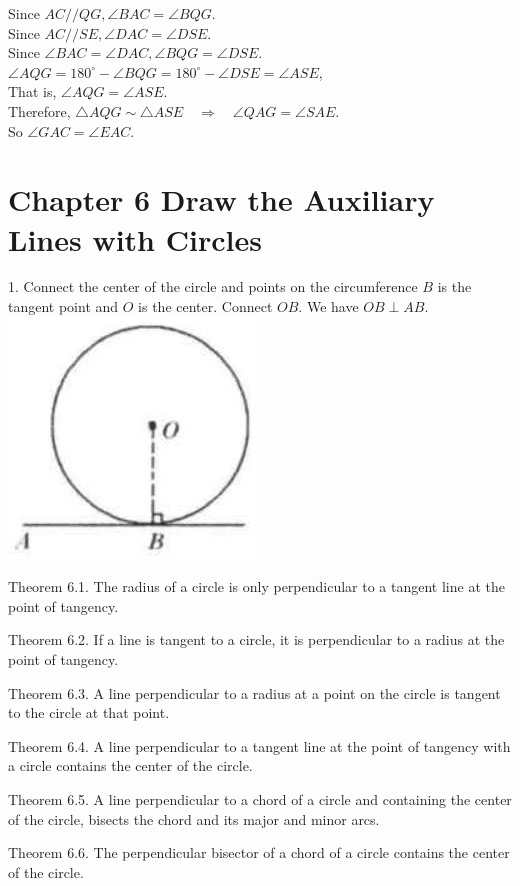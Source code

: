 \documentclass{article}
\begin{document}
Since \(A C / / Q G, \angle B A C=\angle B Q G\).\\
Since \(A C / / S E, \angle D A C=\angle D S E\).\\
Since \(\angle B A C=\angle D A C, \angle B Q G=\angle D S E\).\\
\(\angle A Q G=180^{\circ}-\angle B Q G=180^{\circ}-\angle D S E=\angle A S E\),\\
That is, \(\angle A Q G=\angle A S E\).\\
Therefore, \(\triangle A Q G \sim \triangle A S E \quad \Rightarrow \quad \angle Q A G=\angle S A E\).\\
So \(\angle G A C=\angle E A C\).

\section*{Chapter 6 Draw the Auxiliary Lines with Circles}
1. Connect the center of the circle and points on the circumference
\(B\) is the tangent point and \(O\) is the center. Connect \(O B\). We have \(O B \perp A B\).\\
\centering
\includegraphics[width=\textwidth]{images/146.jpg}

Theorem 6.1. The radius of a circle is only perpendicular to a tangent line at the point of tangency.

Theorem 6.2. If a line is tangent to a circle, it is perpendicular to a radius at the point of tangency.

Theorem 6.3. A line perpendicular to a radius at a point on the circle is tangent to the circle at that point.

Theorem 6.4. A line perpendicular to a tangent line at the point of tangency with a circle contains the center of the circle.

Theorem 6.5. A line perpendicular to a chord of a circle and containing the center of the circle, bisects the chord and its major and minor arcs.

Theorem 6.6. The perpendicular bisector of a chord of a circle contains the center of the circle.
\end{document}

